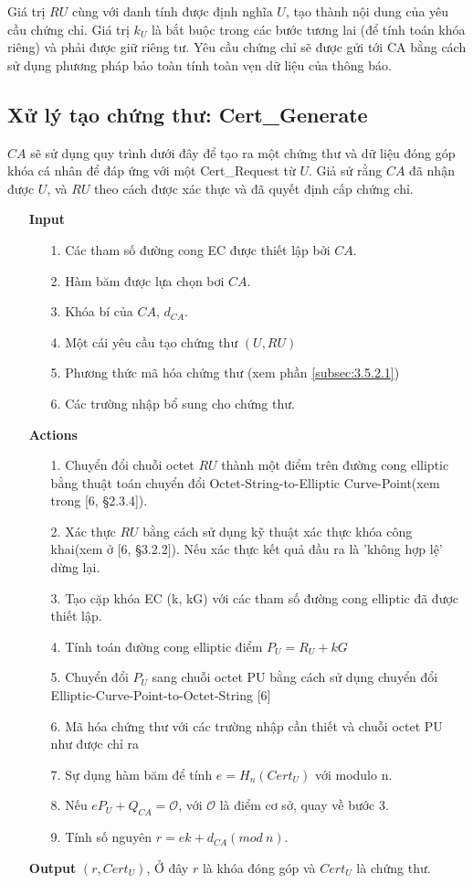 \documentclass[a4paper,12pt]{report}
\begin{document}
Giá trị $RU$ cùng với danh tính được định nghĩa $U$, tạo thành nội dung của yêu cầu chứng chỉ. Giá trị $k_U$ là bắt buộc trong các bước tương lai (để tính toán khóa riêng) và phải được giữ riêng tư. Yêu cầu chứng chỉ sẽ được gửi tới CA bằng cách sử dụng phương pháp bảo toàn tính toàn vẹn dữ liệu của thông báo.
\subsection{Xử lý tạo chứng thư: Cert\_Generate}
$CA$ sẽ sử dụng quy trình dưới đây để tạo ra một chứng thư và dữ liệu đóng góp khóa cá nhân để đáp ứng với một Cert\_Request từ $U$. Giả sử rằng $CA$ đã nhận được $U$, và $RU$ theo cách được xác thực và đã quyết định cấp chứng chỉ.
\begin{itemize}
\item[] \textbf{Input}
\begin{itemize}
\item[1. ] Các tham số đường cong EC được thiết lập bởi $CA$.
\item[2. ] Hàm băm được lựa chọn bơi $CA$.
\item[3. ] Khóa bí của $CA$, $d_{CA}$. 
\item[4. ] Một cái yêu cầu tạo chứng thư $(U, RU)$
\item[5. ] Phương thức mã hóa chứng thư (xem phần \ref{subsec:3.5.2.1})
\item[6. ] Các trường nhập bổ sung cho chứng thư.
\end{itemize}
\item[] \textbf{Actions}
\begin{itemize}
\item[1. ] Chuyển đổi chuỗi octet $RU$ thành một điểm trên đường cong elliptic bằng thuật toán chuyển đổi Octet-String-to-Elliptic Curve-Point(xem trong [6, §2.3.4]).
\item[2. ] Xác thực $RU$ bằng cách sử dụng kỹ thuật xác thực khóa công khai(xem ở [6, §3.2.2]). Nếu xác thực kết quả đầu ra là 'không hợp lệ' dừng lại.
\item[3. ] Tạo cặp khóa EC (k, kG) với các tham số đường cong elliptic đã được thiết lập. 
\item[4. ] Tính toán đường cong elliptic điểm $P_U = R_U + kG$
\item[5. ] Chuyển đổi $P_U$ sang chuỗi octet PU bằng cách sử dụng chuyển đổi Elliptic-Curve-Point-to-Octet-String [6]
\item[6. ] Mã hóa chứng thư với các trường nhập cần thiết và chuỗi octet PU như được chỉ ra
\item[7. ] Sự dụng hàm băm để tính $e = H_n(Cert_U)$ với modulo n.
\item[8. ] Nếu $eP_U + Q_{CA} = \mathcal{O}$, với $\mathcal{O}$ là điểm cơ sở, quay về bước 3.
\item[9. ] Tính số nguyên $r = ek + d_{CA} (mod \ n)$.
\end{itemize}
\item[] \textbf{Output} $(r, Cert_U)$, Ở đây $r$ là khóa đóng góp  và $Cert_U$ là chứng thư.
\end{itemize}
\end{document}
